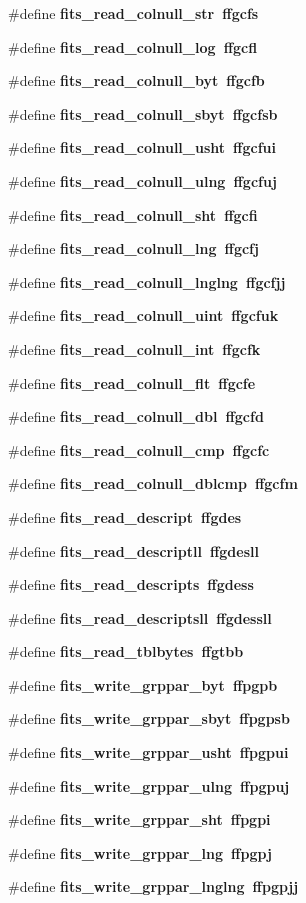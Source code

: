 \begin{CompactItemize}
\#define \bf{fits\_\-read\_\-colnull\_\-str}~ffgcfs
\item 
\#define \bf{fits\_\-read\_\-colnull\_\-log}~ffgcfl
\item 
\#define \bf{fits\_\-read\_\-colnull\_\-byt}~ffgcfb
\item 
\#define \bf{fits\_\-read\_\-colnull\_\-sbyt}~ffgcfsb
\item 
\#define \bf{fits\_\-read\_\-colnull\_\-usht}~ffgcfui
\item 
\#define \bf{fits\_\-read\_\-colnull\_\-ulng}~ffgcfuj
\item 
\#define \bf{fits\_\-read\_\-colnull\_\-sht}~ffgcfi
\item 
\#define \bf{fits\_\-read\_\-colnull\_\-lng}~ffgcfj
\item 
\#define \bf{fits\_\-read\_\-colnull\_\-lnglng}~ffgcfjj
\item 
\#define \bf{fits\_\-read\_\-colnull\_\-uint}~ffgcfuk
\item 
\#define \bf{fits\_\-read\_\-colnull\_\-int}~ffgcfk
\item 
\#define \bf{fits\_\-read\_\-colnull\_\-flt}~ffgcfe
\item 
\#define \bf{fits\_\-read\_\-colnull\_\-dbl}~ffgcfd
\item 
\#define \bf{fits\_\-read\_\-colnull\_\-cmp}~ffgcfc
\item 
\#define \bf{fits\_\-read\_\-colnull\_\-dblcmp}~ffgcfm
\item 
\#define \bf{fits\_\-read\_\-descript}~ffgdes
\item 
\#define \bf{fits\_\-read\_\-descriptll}~ffgdesll
\item 
\#define \bf{fits\_\-read\_\-descripts}~ffgdess
\item 
\#define \bf{fits\_\-read\_\-descriptsll}~ffgdessll
\item 
\#define \bf{fits\_\-read\_\-tblbytes}~ffgtbb
\item 
\#define \bf{fits\_\-write\_\-grppar\_\-byt}~ffpgpb
\item 
\#define \bf{fits\_\-write\_\-grppar\_\-sbyt}~ffpgpsb
\item 
\#define \bf{fits\_\-write\_\-grppar\_\-usht}~ffpgpui
\item 
\#define \bf{fits\_\-write\_\-grppar\_\-ulng}~ffpgpuj
\item 
\#define \bf{fits\_\-write\_\-grppar\_\-sht}~ffpgpi
\item 
\#define \bf{fits\_\-write\_\-grppar\_\-lng}~ffpgpj
\item 
\#define \bf{fits\_\-write\_\-grppar\_\-lnglng}~ffpgpjj

\end{CompactItemize}
